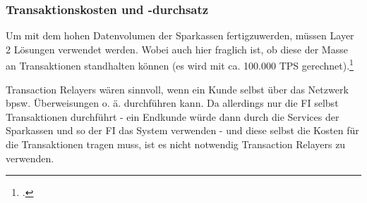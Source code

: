 \subsubsection{Transaktionskosten und -durchsatz}



\bigbreak
\noindent
Um mit dem hohen Datenvolumen der Sparkassen fertigzuwerden, müssen Layer 2 Lösungen verwendet werden. 
Wobei auch hier fraglich ist, ob diese der Masse an Transaktionen standhalten können (es wird mit ca. 100.000 TPS gerechnet).\footcite[Vgl.][]{w34}




\bigbreak
\noindent
Transaction Relayers wären sinnvoll, wenn ein Kunde selbst über das Netzwerk bpsw. Überweisungen o. ä. durchführen kann.
Da allerdings nur die FI selbst Transaktionen durchführt - ein Endkunde würde dann durch die Services der Sparkassen und so der FI das System verwenden - und diese selbst die Kosten für die Transaktionen tragen muss, ist es nicht notwendig Transaction Relayers zu verwenden.
